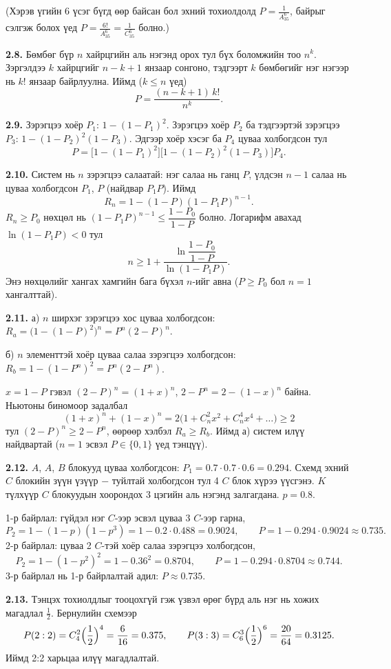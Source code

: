 \documentclass[11pt,a4paper]{article}
\newcommand{\bod}[1]{\par\medskip\noindent\textbf{#1}\quad}
\begin{document}
(Хэрэв үгийн 6 үсэг бүгд өөр байсан бол эхний тохиолдолд $P=\frac{1}{A_{35}^6}$, байрыг сэлгэж болох үед $P=\frac{6!}{A_{35}^6}=\frac{1}{C_{35}^6}$ болно.)

\bod{2.8.}
Бөмбөг бүр $n$ хайрцгийн аль нэгэнд орох тул бүх боломжийн тоо $n^k$. Зэргэлдээ $k$ хайрцгийг $n-k+1$ янзаар сонгоно, тэдгээрт $k$ бөмбөгийг нэг нэгээр нь $k!$ янзаар байрлуулна. Иймд ($k\le n$ үед)
\[
P=\frac{(n-k+1)\,k!}{n^k}.
\]

\bod{2.9.}
Зэрэгцээ хоёр $P_1$: $1-(1-P_1)^2$. Зэрэгцээ хоёр $P_2$ ба тэдгээртэй зэрэгцээ $P_3$: $1-(1-P_2)^2(1-P_3)$. Эдгээр хоёр хэсэг ба $P_4$ цуваа холбогдсон тул
\[
P=\bigl[1-(1-P_1)^2\bigr]\bigl[1-(1-P_2)^2(1-P_3)\bigr]P_4 .
\]

\bod{2.10.}
Систем нь $n$ зэрэгцээ салаатай: нэг салаа нь ганц $P$, үлдсэн $n-1$ салаа нь цуваа холбогдсон $P_1$, $P$ (найдвар $P_1P$). Иймд
\[
R_n=1-(1-P)(1-P_1P)^{n-1}.
\]
$R_n\ge P_0$ нөхцөл нь $(1-P_1P)^{n-1}\le\dfrac{1-P_0}{1-P}$ болно. Логарифм авахад $\ln(1-P_1P)<0$ тул
\[
n\ge 1+\frac{\ln\dfrac{1-P_0}{1-P}}{\ln(1-P_1P)} .
\]
Энэ нөхцөлийг хангах хамгийн бага бүхэл $n$-ийг авна ($P\ge P_0$ бол $n=1$ хангалттай).

\bod{2.11.}
а) $n$ ширхэг зэрэгцээ хос цуваа холбогдсон: $R_a=\bigl(1-(1-P)^2\bigr)^n=P^n(2-P)^n$.

б) $n$ элементтэй хоёр цуваа салаа зэрэгцээ холбогдсон: $R_b=1-(1-P^n)^2=P^n(2-P^n)$.

$x=1-P$ гэвэл $(2-P)^n=(1+x)^n$, $2-P^n=2-(1-x)^n$ байна. Ньютоны биномоор задалбал
\[
(1+x)^n+(1-x)^n=2\bigl(1+C_n^2x^2+C_n^4x^4+\dots\bigr)\ge 2
\]
тул $(2-P)^n\ge 2-P^n$, өөрөөр хэлбэл $R_a\ge R_b$. Иймд а) систем илүү найдвартай ($n=1$ эсвэл $P\in\{0,1\}$ үед тэнцүү).

\bod{2.12.}
$A$, $A$, $B$ блокууд цуваа холбогдсон: $P_1=0.7\cdot0.7\cdot0.6=0.294$.
Схемд эхний $C$ блокийн зүүн үзүүр $-$ туйлтай холбогдсон тул 4 $C$ блок хүрээ үүсгэнэ. $K$ түлхүүр $C$ блокуудын хоорондох 3 цэгийн аль нэгэнд залгагдана. $p=0.8$.

1-р байрлал: гүйдэл нэг $C$-ээр эсвэл цуваа 3 $C$-ээр гарна,
\[
P_2=1-(1-p)(1-p^3)=1-0.2\cdot0.488=0.9024,\qquad P=1-0.294\cdot0.9024\approx0.735 .
\]
2-р байрлал: цуваа 2 $C$-тэй хоёр салаа зэрэгцээ холбогдсон,
\[
P_2=1-(1-p^2)^2=1-0.36^2=0.8704,\qquad P=1-0.294\cdot0.8704\approx0.744 .
\]
3-р байрлал нь 1-р байрлалтай адил: $P\approx0.735$.

\bod{2.13.}
Тэнцэх тохиолдлыг тооцохгүй гэж үзвэл өрөг бүрд аль нэг нь хожих магадлал $\frac12$. Бернулийн схемээр
\[
P(2:2)=C_4^2\Bigl(\frac12\Bigr)^4=\frac{6}{16}=0.375,\qquad
P(3:3)=C_6^3\Bigl(\frac12\Bigr)^6=\frac{20}{64}=0.3125 .
\]
Иймд 2:2 харьцаа илүү магадлалтай.
\end{document}
